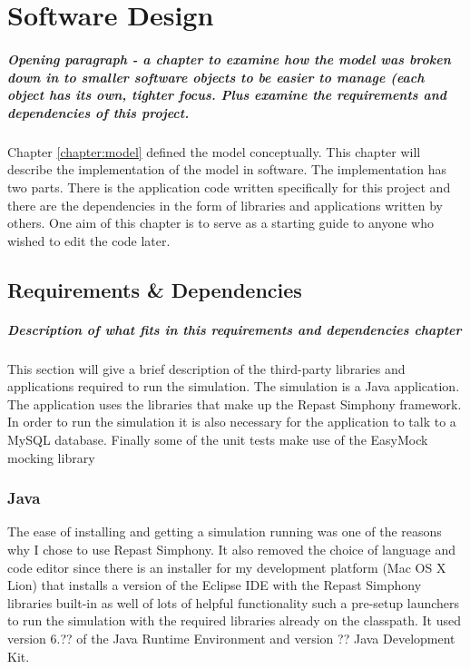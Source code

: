 \chapter{Software Design}\label{chapter:softwaredesign}

\paragraph{Opening paragraph - a chapter to examine how the model was
  broken down in to smaller software objects to be easier to manage
  (each object has its own, tighter focus. Plus examine the
  requirements and dependencies of this project.}

Chapter \ref{chapter:model} defined the model conceptually. This
chapter will describe the implementation of the model in software. The
implementation has two parts. There is the application code written
specifically for this project and there are the dependencies in the
form of libraries and applications written by others. One aim of this
chapter is to serve as a starting guide to anyone who wished to edit
the code later.


\section{Requirements \& Dependencies}
  \paragraph{Description of what fits in this requirements and
    dependencies chapter}
This section will give a brief description of the third-party
libraries and applications required to run the simulation. The
simulation is a Java application. The application uses the libraries that make up the Repast Simphony
framework. In order to run the simulation it is also necessary for the
application to talk to a MySQL database. Finally some of the unit 
tests make use of the EasyMock mocking library 

  \subsection{Java}
  The ease of installing and getting a simulation running was one of
  the reasons why I chose to use Repast Simphony. It also removed the
  choice of language and code editor since there is an
  installer for my development platform (Mac OS X Lion) that installs a version of the Eclipse IDE
  with the Repast Simphony libraries built-in as well of lots of
  helpful functionality such a pre-setup launchers to run the simulation
  with the required libraries already on the classpath. It used
  version 6.?? of the Java Runtime Environment and version ?? Java Development Kit.

